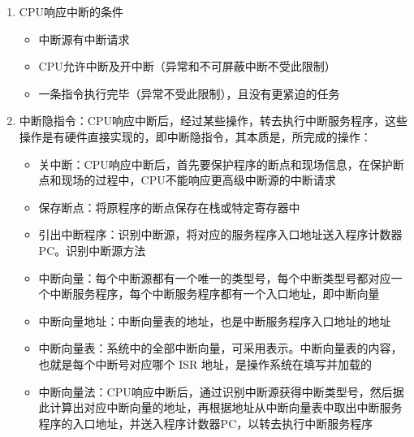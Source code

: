 \documentclass[./computer-organization-and-architecture.tex]{subfiles}
\begin{document}
\begin{enumerate}
\begin{itemize}
            \item 不可屏蔽中断：通过NMI线发出，用于处理紧急和重要的事件，优先级最高
            \item 不可屏蔽中断 $>$ 可屏蔽中断
            \item 高速设备 $>$ 低速设备
            \item 输入设备 $>$ 输出设备
            \item 实时设备 $>$ 普通设备
        \end{itemize}
        \item CPU响应中断的条件
        \begin{itemize}
            \item 中断源有中断请求
            \item CPU允许中断及开中断（异常和不可屏蔽中断不受此限制）
            \item 一条指令执行完毕（异常不受此限制），且没有更紧迫的任务
        \end{itemize}
        \item 中断隐指令：CPU响应中断后，经过某些操作，转去执行中断服务程序，这些操作是有硬件直接实现的，即中断隐指令，其本质是{\color{customgreen}{CPU内部硬件控制逻辑自动完成的一系列操作}}，所完成的操作：
        \begin{itemize}
            \item 关中断：CPU响应中断后，首先要保护程序的断点和现场信息，在保护断点和现场的过程中，CPU不能响应更高级中断源的中断请求
            \item 保存断点：将原程序的断点保存在栈或特定寄存器中
            \item 引出中断程序：识别中断源，将对应的服务程序入口地址送入程序计数器PC。识别中断源方法
            \item 中断向量：每个中断源都有一个唯一的类型号，每个中断类型号都对应一个中断服务程序，每个中断服务程序都有一个入口地址，即中断向量
            \item 中断向量地址：中断向量表的地址，也是中断服务程序入口地址的地址
            \item 中断向量表：系统中的全部中断向量，可采用{\color{red}{数组}}表示。中断向量表的内容，也就是每个中断号对应哪个 ISR 地址，是操作系统在{\color{red}{内核初始化阶段}}填写并加载的
            \item 中断向量法：CPU响应中断后，通过识别中断源获得中断类型号，然后据此计算出对应中断向量的地址，再根据地址从中断向量表中取出中断服务程序的入口地址，并送入程序计数器PC，以转去执行中断服务程序

\end{itemize}
\end{enumerate}
\end{document}
